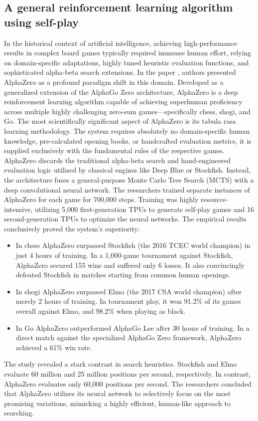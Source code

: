 \subsection{A general reinforcement learning algorithm using self-play} %
In the historical context of artificial intelligence, achieving high-performance results in complex board games typically required immense human effort, relying on domain-specific adaptations, highly tuned heuristic evaluation functions, and sophisticated alpha-beta search extensions. In the paper \cite{SilverDavid2018Agrl}, authors presented AlphaZero as a profound paradigm shift in this domain. Developed as a generalized extension of the AlphaGo Zero architecture, AlphaZero is a deep reinforcement learning algorithm capable of achieving superhuman proficiency across multiple highly challenging zero-sum games—specifically chess, shogi, and Go. The most scientifically significant aspect of AlphaZero is its tabula rasa %
learning methodology. The system requires absolutely no domain-specific human knowledge, pre-calculated opening books, or handcrafted evaluation metrics, it is supplied exclusively with the fundamental rules of the respective games. AlphaZero discards the traditional alpha-beta search and hand-engineered evaluation logic utilized by classical engines like Deep Blue or Stockfish. Instead, the architecture fuses a general-purpose Monte Carlo Tree Search (MCTS) with a deep convolutional neural network.
The researchers trained separate instances of AlphaZero for each game for 700,000 steps. Training was highly resource-intensive, utilizing 5,000 first-generation TPUs to generate self-play games and 16 second-generation TPUs to optimize the neural networks. The empirical results conclusively proved the system's superiority:
\begin{itemize}
	\item In chess AlphaZero surpassed Stockfish (the 2016 TCEC world champion) in just 4 hours of training. In a 1,000-game tournament against Stockfish, AlphaZero secured 155 wins and suffered only 6 losses. It also convincingly defeated Stockfish in matches starting from common human openings.
	\item In shogi AlphaZero surpassed Elmo (the 2017 CSA world champion) after merely 2 hours of training. In tournament play, it won 91.2\% of its games overall against Elmo, and 98.2\% when playing as black.
	\item In Go AlphaZero outperformed AlphaGo Lee after 30 hours of training. In a direct match against the specialized AlphaGo Zero framework, AlphaZero achieved a 61\% win rate.
\end{itemize}
The study revealed a stark contrast in search heuristics. Stockfish and Elmo evaluate 60 million and 25 million positions per second, respectively. In contrast, AlphaZero evaluates only 60,000 positions per second. The researchers concluded that AlphaZero utilizes its neural network to selectively focus on the most promising variations, mimicking a highly efficient, human-like approach to searching.

